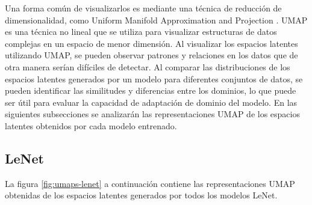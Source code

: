 Una forma común de visualizarlos es mediante una técnica de reducción de dimensionalidad, como Uniform Manifold
Approximation and Projection \parencite{mcinnes2018umap}. UMAP es una técnica no lineal que se utiliza para visualizar estructuras de datos complejas en
un espacio de menor dimensión. Al visualizar los espacios latentes utilizando UMAP, se pueden observar patrones y
relaciones en los datos que de otra manera serían difíciles de detectar. Al comparar las distribuciones de los espacios
latentes generados por un modelo para diferentes conjuntos de datos, se pueden identificar las similitudes y
diferencias entre los dominios, lo que puede ser útil para evaluar la capacidad de adaptación de dominio del modelo. En
las siguientes subsecciones se analizarán las representaciones UMAP de los espacios latentes obtenidos por cada modelo
entrenado.

\subsection{LeNet}

La figura \ref{fig:umaps-lenet} a continuación contiene las representaciones UMAP obtenidas de los espacios latentes
generados por todos los modelos LeNet.

